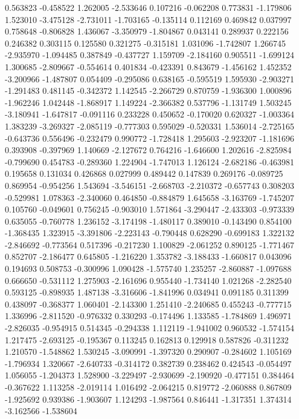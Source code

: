 0.563823
-0.458522
1.262005
-2.533646
0.107216
-0.062208
0.773831
-1.179806
1.523010
-3.475128
-2.731011
-1.703165
-0.135114
0.112169
0.469842
0.037997
0.758648
-0.806828
1.436067
-3.350979
-1.804867
0.043141
0.289937
0.222156
0.246382
0.303115
0.125580
0.321275
-0.315181
1.031096
-1.742807
1.266745
-2.935970
-1.094485
0.387849
-0.437727
1.159709
-2.184160
0.905511
-1.699124
1.300685
-2.809667
-0.554614
0.401834
-0.423391
0.843679
-1.456162
1.452352
-3.200966
-1.487807
0.054409
-0.295086
0.638165
-0.595519
1.595930
-2.903271
-1.291483
0.481145
-0.342372
1.142545
-2.266729
0.870759
-1.936300
1.000896
-1.962246
1.042448
-1.868917
1.149224
-2.366382
0.537796
-1.131749
1.503245
-3.180941
-1.647817
-0.091116
0.233228
0.450652
-0.170020
0.620327
-1.003364
1.383239
-3.269327
-2.085119
-0.777303
0.595029
-0.520331
1.536014
-2.725165
-0.643736
0.556496
-0.232479
0.990772
-1.728418
1.295603
-2.923207
-1.181696
0.393908
-0.397969
1.140669
-2.127672
0.764216
-1.646600
1.202616
-2.825984
-0.799690
0.454783
-0.289360
1.224904
-1.747013
1.126124
-2.682186
-0.463981
0.195658
0.131034
0.426868
0.027999
0.489442
0.147839
0.269176
-0.089725
0.869954
-0.954256
1.543694
-3.546151
-2.668703
-2.210372
-0.657743
0.308203
-0.529981
1.078363
-2.340060
0.464850
-0.884879
1.645658
-3.163769
-1.745207
0.105760
-0.049601
0.756245
-0.903010
1.571864
-3.290447
-2.433303
-0.973339
0.635055
-0.760778
1.236152
-3.174198
-1.480117
0.389010
-0.143490
0.854100
-1.368435
1.323915
-3.391806
-2.223143
-0.790448
0.628290
-0.699183
1.322132
-2.846692
-0.773564
0.517396
-0.217230
1.100829
-2.061252
0.890125
-1.771467
0.852707
-2.186477
0.645805
-1.216220
1.353782
-3.188433
-1.660817
0.043096
0.194693
0.508753
-0.300996
1.090428
-1.575740
1.235257
-2.860887
-1.097688
0.666650
-0.531112
1.275903
-2.161696
0.955440
-1.734140
1.021268
-2.282540
0.593125
-0.898935
1.487138
-3.316606
-1.841996
0.034941
0.091185
0.311399
0.438097
-0.368377
1.060401
-2.143300
1.251410
-2.240685
0.455243
-0.777715
1.336996
-2.811520
-0.976332
0.330293
-0.174496
1.133585
-1.784869
1.496971
-2.826035
-0.954915
0.514345
-0.294338
1.112119
-1.941002
0.960532
-1.574154
1.217475
-2.693125
-0.195367
0.113245
0.162813
0.129918
0.587826
-0.311232
1.210570
-1.548862
1.530245
-3.090991
-1.397320
0.290907
-0.284602
1.105169
-1.796934
1.320667
-2.640733
-0.314172
0.382739
0.238462
0.424543
-0.054497
1.056055
-1.204373
1.528900
-3.229497
-2.930699
-2.190920
-0.477151
0.384464
-0.367622
1.113258
-2.019114
1.016492
-2.064215
0.819772
-2.060888
0.867809
-1.925692
0.939386
-1.903607
1.124293
-1.987564
0.846441
-1.317351
1.374314
-3.162566
-1.538604
